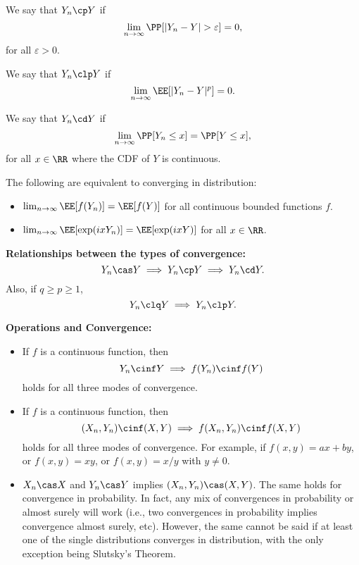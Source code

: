 \begin{definition}

We say that $Y_n\cp Y$ if 
\[\lim_{n\rightarrow \infty}\PP[\vert Y_n-Y\vert > \varepsilon] = 0,\]
for all $\varepsilon > 0$.
\end{definition}

\begin{definition}

We say that $Y_n\clp Y$ if 
\[\lim_{n\rightarrow \infty}\EE[\vert Y_n-Y\vert^p] = 0.\]
\end{definition}

\begin{definition}

We say that $Y_n\cd Y$ if 
\[\lim_{n\rightarrow \infty}\PP[Y_n\leq x] = \PP[Y\leq x],\]
for all $x\in \RR$ where the CDF of $Y$ is continuous. 
\end{definition}

The following are equivalent to converging in distribution:
\begin{itemize}
    \item $\lim_{n\rightarrow \infty}\EE[f(Y_n)] = \EE[f(Y)]$ for all continuous bounded functions $f$.
    \item $\lim_{n\rightarrow \infty}\EE[\exp(ixY_n)] = \EE[\exp(ixY)]$ for all $x\in \RR$. 
\end{itemize}
\textbf{Relationships between the types of convergence: }
\[Y_n\cas Y \implies Y_n\cp Y \implies Y_n\cd Y.\]
Also, if $q\geq p \geq 1$, 
\[Y_n\clq Y \implies Y_n\clp Y.\]

\noindent\textbf{Operations and Convergence:}
\begin{itemize}
    \item If $f$ is a continuous function, then 
    \[Y_n\cinf Y \implies f(Y_n)\cinf f(Y)\]
    holds for all three modes of convergence.
    \item If $f$ is a continuous function, then 
    \[(X_n, Y_n)\cinf (X,Y) \implies f(X_n, Y_n)\cinf f(X,Y)\]
    holds for all three modes of convergence. For example, if $f(x,y) = ax+by$, or $f(x,y) = xy$, or $f(x,y) = x/y$ with $y\neq 0$. 
    \item $X_n\cas X$ and $Y_n\cas Y$ implies $(X_n, Y_n)\cas (X,Y)$. The same holds for convergence in probability. In fact, any mix of convergences in probability or almost surely will work (i.e., two convergences in probability implies convergence almost surely, etc). However, the same cannot be said if at least one of the single distributions converges in distribution, with the only exception being Slutsky's Theorem.
\end{itemize}

